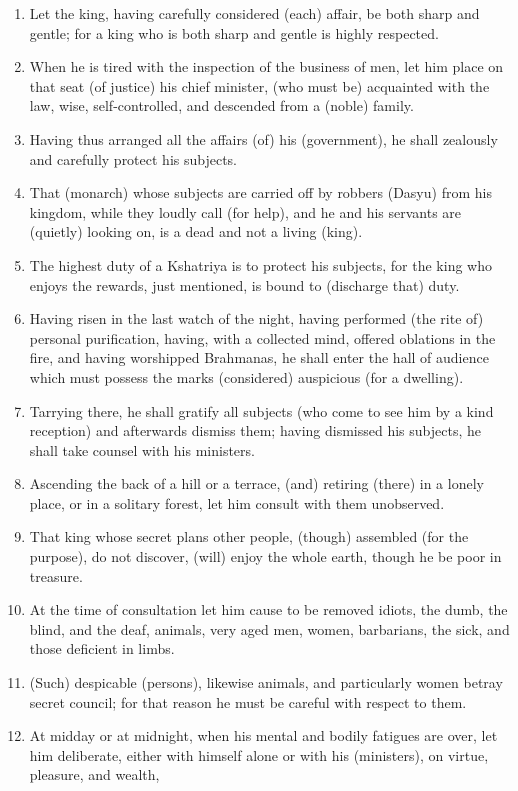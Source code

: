 \begin{enumerate}
\item Let the king, having carefully considered (each) affair, be both sharp and gentle; for a king who is both sharp and gentle is highly respected.
\item When he is tired with the inspection of the business of men, let him place on that seat (of justice) his chief minister, (who must be) acquainted with the law, wise, self-controlled, and descended from a (noble) family.
\item Having thus arranged all the affairs (of) his (government), he shall zealously and carefully protect his subjects.
\item That (monarch) whose subjects are carried off by robbers (Dasyu) from his kingdom, while they loudly call (for help), and he and his servants are (quietly) looking on, is a dead and not a living (king).
\item The highest duty of a Kshatriya is to protect his subjects, for the king who enjoys the rewards, just mentioned, is bound to (discharge that) duty.
\item Having risen in the last watch of the night, having performed (the rite of) personal purification, having, with a collected mind, offered oblations in the fire, and having worshipped Brahmanas, he shall enter the hall of audience which must possess the marks (considered) auspicious (for a dwelling).
\item Tarrying there, he shall gratify all subjects (who come to see him by a kind reception) and afterwards dismiss them; having dismissed his subjects, he shall take counsel with his ministers.
\item Ascending the back of a hill or a terrace, (and) retiring (there) in a lonely place, or in a solitary forest, let him consult with them unobserved.
\item That king whose secret plans other people, (though) assembled (for the purpose), do not discover, (will) enjoy the whole earth, though he be poor in treasure.
\item At the time of consultation let him cause to be removed idiots, the dumb, the blind, and the deaf, animals, very aged men, women, barbarians, the sick, and those deficient in limbs.
\item (Such) despicable (persons), likewise animals, and particularly women betray secret council; for that reason he must be careful with respect to them.
\item At midday or at midnight, when his mental and bodily fatigues are over, let him deliberate, either with himself alone or with his (ministers), on virtue, pleasure, and wealth,

\end{enumerate}
